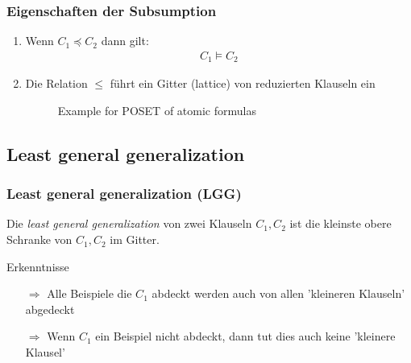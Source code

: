 \begin{frame}
	\frametitle{Eigenschaften der Subsumption}
	\begin{enumerate}
		\item {
			Wenn $C_1 \preceq C_2$ dann gilt:
			\begin{align*}
				C_1 \vDash C_2
			\end{align*}
		}
		\item{ Die Relation $\leq$ führt ein Gitter (lattice) von reduzierten Klauseln ein
			\begin{figure}[H]
				\begin{center}
				\end{center}
				\caption{Example for POSET of atomic formulas}
				\label{fig:poset_atomic}
			\end{figure}
		}
	\end{enumerate}
\end{frame}

\subsection{Least general generalization}
\begin{frame}
	\frametitle{Least general generalization (LGG)}
	 Die \textit{least general generalization} von zwei Klauseln $C_1, C_2$ ist
	 die kleinste obere Schranke von $C_1,C_2$ im Gitter.

	\begin{block}{Erkenntnisse}
			\begin{itemize}
				\item [$\Rightarrow$] Alle Beispiele die $C_1$ abdeckt werden auch von
				allen 'kleineren Klauseln' abgedeckt
				\item[$\Rightarrow$] Wenn $C_1$ ein Beispiel nicht abdeckt,
				dann tut dies auch keine 'kleinere Klausel'
			\end{itemize}
	 \end{block}
\end{frame}

